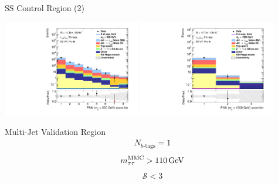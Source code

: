 \documentclass[11pt, xcolor={dvipsnames}, aspectratio=169, notes]{beamer}
\begin{document}

\begin{frame}{SS Control Region (2)}
  \centering

  \includegraphics[width=0.45\textwidth]{vrplots/ssvr/Region_BMin0_incJet1_distPNN500_J2_Y2015_DLLSS_T2_SpcTauHH_L0_Prefitlog}%
  \hfill%
  \includegraphics[width=0.45\textwidth]{vrplots/ssvr/Region_BMin0_incJet1_distPNN1000_J2_Y2015_DLLSS_T2_SpcTauHH_L0_Prefitlog}
\end{frame}


\begin{frame}{Multi-Jet Validation Region}
  \begin{align*}
    N_{b\text{-tags}} = 1
  \end{align*}
  \begin{align*}
    \mMMC > \SI{110}{\GeV}
  \end{align*}
  \begin{align*}
    \mathcal{S} < 3
  \end{align*}
\end{frame}

\end{document}
